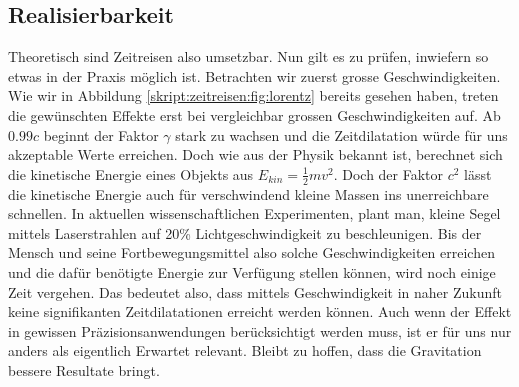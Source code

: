 \begin{refsection}
	\section{Realisierbarkeit}
    
    Theoretisch sind Zeitreisen also umsetzbar. Nun gilt es zu prüfen, inwiefern so etwas in der Praxis möglich ist. Betrachten wir zuerst grosse Geschwindigkeiten. Wie wir in Abbildung \ref{skript:zeitreisen:fig:lorentz} bereits gesehen haben, treten die gewünschten Effekte erst bei vergleichbar grossen Geschwindigkeiten auf. Ab $0.99c$ beginnt der Faktor  $\gamma$ stark zu wachsen und die Zeitdilatation würde für uns akzeptable Werte erreichen.
    Doch wie aus der Physik bekannt ist, berechnet sich die kinetische Energie eines Objekts aus $E_{kin}=\frac{1}{2}mv^2$. Doch der Faktor $c^2$ lässt die kinetische Energie auch für verschwindend kleine Massen ins unerreichbare schnellen.
    In aktuellen wissenschaftlichen Experimenten, plant man, kleine Segel mittels Laserstrahlen auf 20\% Lichtgeschwindigkeit zu beschleunigen. Bis der Mensch und seine Fortbewegungsmittel also solche Geschwindigkeiten erreichen und die dafür benötigte Energie zur Verfügung stellen können, wird noch einige Zeit vergehen.
    Das bedeutet also, dass mittels Geschwindigkeit in naher Zukunft keine signifikanten Zeitdilatationen erreicht werden können. Auch wenn der Effekt in gewissen Präzisionsanwendungen berücksichtigt werden muss, ist er für uns nur anders als eigentlich Erwartet relevant. Bleibt zu hoffen, dass die Gravitation bessere Resultate bringt. 
    

\end{refsection}
